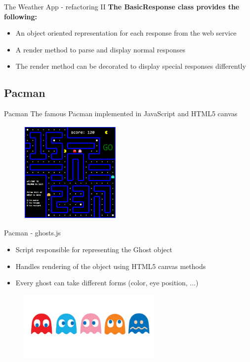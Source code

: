 \documentclass{beamer}
\begin{document}
\begin{frame}{The Weather App - refactoring II}
\textbf{The BasicResponse class provides the following:}
\begin{itemize}
    \item An object oriented representation for each response from the web service
    \item A render method to parse and display normal responses
    \item The render method can be decorated to display special responses differently 
\end{itemize}
\end{frame}



\subsection{Pacman}
\begin{frame}{Pacman}
The famous Pacman implemented in JavaScript and HTML5 canvas
    \begin{figure}[htp]
    \centering
    \includegraphics[width=5cm]{pics/pacman}
    \label{fig:pacman}
    \end{figure}
    
\end{frame}

\begin{frame}{Pacman - ghosts.js}
\begin{itemize}
\item Script responsible for representing the Ghost object
\item Handles rendering of the object using HTML5 canvas methods
\item Every ghost can take different forms (color, eye position, ...)
\end{itemize}

    \begin{figure}[htp]
    \centering
    \includegraphics[width=7cm]{pics/ghosts}
    \label{fig:ghosts}
    \end{figure}
\end{frame}
\end{document}
